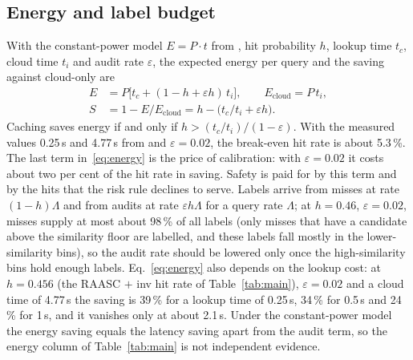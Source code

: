 \documentclass[journal]{IEEEtran}
\newcommand{\pct}{\,\%}
\begin{document}
\subsection{Energy and label budget}\label{sec:energy}
With the constant-power model $E=P\cdot t$ from \cite{montoya2025}, hit probability $h$, lookup time $t_c$, cloud time $t_i$ and audit rate $\varepsilon$, the expected energy per query and the saving against cloud-only are
\begin{align}
E&=P\big[t_c+(1-h+\varepsilon h)\,t_i\big],\qquad E_{\text{cloud}}=P\,t_i,\nonumber\\
S&=1-E/E_{\text{cloud}}=h-\big(t_c/t_i+\varepsilon h\big).\label{eq:energy}
\end{align}
Caching saves energy if and only if $h>(t_c/t_i)/(1-\varepsilon)$. With the measured values 0.25\,s and 4.77\,s from \cite{montoya2025} and $\varepsilon=0.02$, the break-even hit rate is about 5.3\pct{}. The last term in~\eqref{eq:energy} is the price of calibration: with $\varepsilon=0.02$ it costs about two per cent of the hit rate in saving. Safety is paid for by this term and by the hits that the risk rule declines to serve. Labels arrive from misses at rate $(1-h)\Lambda$ and from audits at rate $\varepsilon h\Lambda$ for a query rate $\Lambda$; at $h=0.46$, $\varepsilon=0.02$, misses supply at most about 98\pct{} of all labels (only misses that have a candidate above the similarity floor are labelled, and these labels fall mostly in the lower-similarity bins), so the audit rate should be lowered only once the high-similarity bins hold enough labels. Eq.~\eqref{eq:energy} also depends on the lookup cost: at $h=0.456$ (the RAASC $+$ inv hit rate of Table~\ref{tab:main}), $\varepsilon=0.02$ and a cloud time of 4.77\,s the saving is 39\pct{} for a lookup time of 0.25\,s, 34\pct{} for 0.5\,s and 24\pct{} for 1\,s, and it vanishes only at about 2.1\,s. Under the constant-power model the energy saving equals the latency saving apart from the audit term, so the energy column of Table~\ref{tab:main} is not independent evidence.
\end{document}
